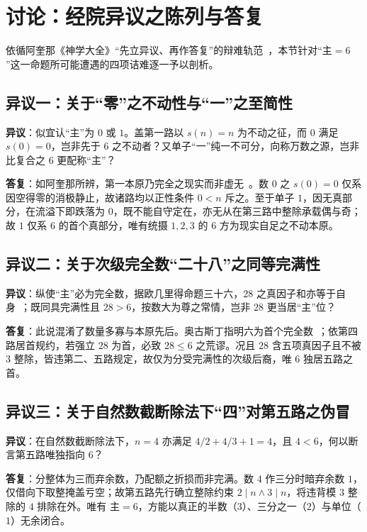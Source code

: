 \documentclass[11pt,a4paper]{ctexart}
\begin{document}
\section{讨论：经院异议之陈列与答复}

依循阿奎那《神学大全》``先立异议、再作答复''的辩难轨范~\cite{aquinas}，本节针对``$\text{主}=6$''这一命题所可能遭遇的四项诘难逐一予以剖析。

\subsection{异议一：关于``零''之不动性与``一''之至简性}

\noindent\textbf{异议}：似宜认``主''为 $0$ 或 $1$。盖第一路以 $s(n)=n$ 为不动之征，而 $0$ 满足 $s(0)=0$，岂非先于 $6$ 之不动者？又单子``一''纯一不可分，向称万数之源，岂非比复合之 $6$ 更配称``主''？

\noindent\textbf{答复}：如阿奎那所辨，第一本原乃完全之现实而非虚无~\cite{aquinas}。数 $0$ 之 $s(0)=0$ 仅系因空得零的消极静止，故诸路均以正性条件 $0<n$ 斥之。至于单子 $1$，因无真部分，在流溢下即跌落为 $0$，既不能自守定在，亦无从在第三路中整除承载偶与奇；故 $1$ 仅系 $6$ 的首个真部分，唯有统摄 $1, 2, 3$ 的 $6$ 方为现实自足之不动本原。

\subsection{异议二：关于次级完全数``二十八''之同等完满性}

\noindent\textbf{异议}：纵使``主''必为完全数，据欧几里得命题三十六，$28$ 之真因子和亦等于自身~\cite{euclid}；既同具完满性且 $28>6$，按数大为尊之常情，岂非 $28$ 更当居``主''位？

\noindent\textbf{答复}：此说混淆了数量多寡与本原先后。奥古斯丁指明六为首个完全数~\cite{augustine}；依第四路居首规约，若强立 $28$ 为首，必致 $28\le 6$ 之荒谬。况且 $28$ 含五项真因子且不被 $3$ 整除，皆违第二、五路规定，故仅为分受完满性的次级后裔，唯 $6$ 独居五路之首。

\subsection{异议三：关于自然数截断除法下``四''对第五路之伪冒}

\noindent\textbf{异议}：在自然数截断除法下，$n=4$ 亦满足 $4/2+4/3+1=4$，且 $4<6$，何以断言第五路唯独指向 $6$？

\noindent\textbf{答复}：分整体为三而弃余数，乃配额之折损而非完满。数 $4$ 作三分时暗弃余数 $1$，仅借向下取整掩盖亏空；故第五路先行确立整除约束 $2\mid n\land 3\mid n$，将违背模 $3$ 整除的 $4$ 排除在外。唯有 $\text{主}=6$，方能以真正的半数（$3$）、三分之一（$2$）与单位（$1$）无余闭合。
\end{document}

